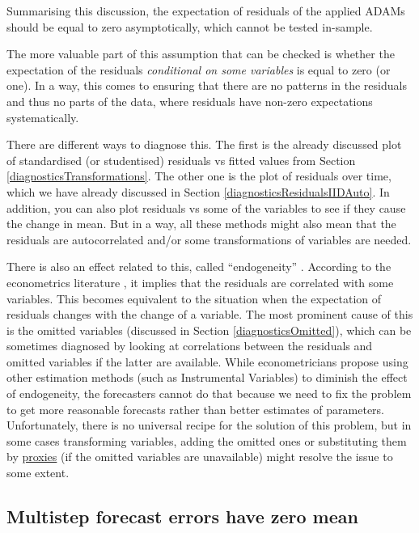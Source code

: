 \documentclass[
]{book}
\theoremstyle{definition}
\theoremstyle{definition}
\theoremstyle{definition}
\theoremstyle{definition}
\theoremstyle{remark}
\begin{document}
Summarising this discussion, the expectation of residuals of the applied ADAMs should be equal to zero asymptotically, which cannot be tested in-sample.

The more valuable part of this assumption that can be checked is whether the expectation of the residuals \emph{conditional on some variables} is equal to zero (or one). In a way, this comes to ensuring that there are no patterns in the residuals and thus no parts of the data, where residuals have non-zero expectations systematically.

There are different ways to diagnose this. The first is the already discussed plot of standardised (or studentised) residuals vs fitted values from Section \ref{diagnosticsTransformations}. The other one is the plot of residuals over time, which we have already discussed in Section \ref{diagnosticsResidualsIIDAuto}. In addition, you can also plot residuals vs some of the variables to see if they cause the change in mean. But in a way, all these methods might also mean that the residuals are autocorrelated and/or some transformations of variables are needed.

There is also an effect related to this, called ``endogeneity'' \citep[discussed briefly in Section 12.3 of][]{SvetunkovSBA}. According to the econometrics literature \citep[see for example,][]{Hanck2020}, it implies that the residuals are correlated with some variables. This becomes equivalent to the situation when the expectation of residuals changes with the change of a variable. The most prominent cause of this is the omitted variables (discussed in Section \ref{diagnosticsOmitted}), which can be sometimes diagnosed by looking at correlations between the residuals and omitted variables if the latter are available. While econometricians propose using other estimation methods (such as Instrumental Variables) to diminish the effect of endogeneity, the forecasters cannot do that because we need to fix the problem to get more reasonable forecasts rather than better estimates of parameters. Unfortunately, there is no universal recipe for the solution of this problem, but in some cases transforming variables, adding the omitted ones or substituting them by \href{https://en.wikipedia.org/wiki/Proxy_(statistics)}{proxies} (if the omitted variables are unavailable) might resolve the issue to some extent.

\hypertarget{diagnosticsResidualsIIDExpectationMultiple}{%
\subsection{Multistep forecast errors have zero mean}\label{diagnosticsResidualsIIDExpectationMultiple}}
\end{document}
